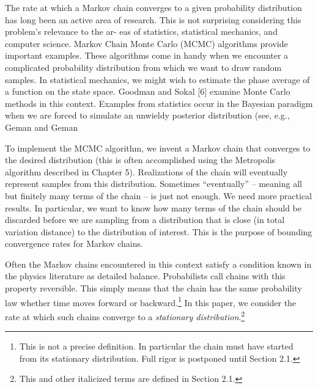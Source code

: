 The rate at which a Markov chain converges to a given probability distribution has long
been an active area of research. This is not surprising considering this problem’s relevance to the ar-
eas of statistics, statistical mechanics, and computer science. Markov Chain Monte Carlo (MCMC)
algorithms provide important examples. These algorithms come in handy when we encounter a
complicated probability distribution from which we want to draw random samples. In statistical
mechanics, we might wish to estimate the phase average of a function on the state space. Goodman
and Sokal [6] examine Monte Carlo methods in this context. Examples from statistics occur in the
Bayesian paradigm when we are forced to simulate an unwieldy posterior distribution (see, e.g.,
Geman and Geman 

To implement the MCMC algorithm, we invent a Markov chain that converges to the
desired distribution (this is often accomplished using the Metropolis algorithm
described in Chapter 5). Realizations of the chain will eventually represent
samples from this distribution. Sometimes ``eventually'' -- meaning all but
finitely many terms of the chain -- is just not enough. We need more practical
results. In particular, we want to know how many terms of the chain should be 
discarded before we are sampling from a distribution that is close (in total variation distance) to
the distribution of interest. This is the purpose of bounding convergence rates for Markov chains.

Often the Markov chains encountered in this context satisfy a condition known in the
physics literature as detailed balance. Probabilists call chains with this property reversible. This
simply means that the chain has the same probability law whether time moves
forward or 
backward.\footnote{This is not a precise definition. In particular the chain must
  have started from its stationary distribution. Full rigor is postponed until Section 2.1.}
In this paper, we consider the rate at which such chains converge to a \emph{stationary distribution}.\footnote{This and other italicized terms are defined in Section 2.1.}

